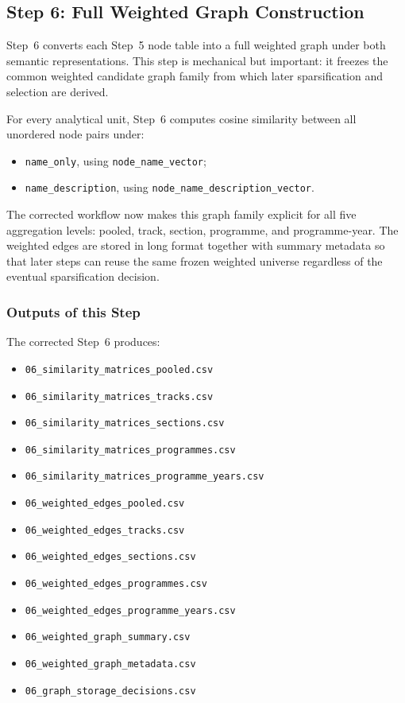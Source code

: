 \subsection{Step 6: Full Weighted Graph Construction}
\label{sec:step6_weighted_graphs}

Step~6 converts each Step~5 node table into a full weighted graph under both semantic representations. This step is mechanical but important: it freezes the common weighted candidate graph family from which later sparsification and selection are derived.

For every analytical unit, Step~6 computes cosine similarity between all unordered node pairs under:
\begin{itemize}
    \item \texttt{name\_only}, using \texttt{node\_name\_vector};
    \item \texttt{name\_description}, using \texttt{node\_name\_description\_vector}.
\end{itemize}

The corrected workflow now makes this graph family explicit for all five aggregation levels: pooled, track, section, programme, and programme-year. The weighted edges are stored in long format together with summary metadata so that later steps can reuse the same frozen weighted universe regardless of the eventual sparsification decision.

\subsubsection{Outputs of this Step}
\label{sec:step6_outputs}

The corrected Step~6 produces:
\begin{itemize}
    \item \texttt{06\_similarity\_matrices\_pooled.csv}
    \item \texttt{06\_similarity\_matrices\_tracks.csv}
    \item \texttt{06\_similarity\_matrices\_sections.csv}
    \item \texttt{06\_similarity\_matrices\_programmes.csv}
    \item \texttt{06\_similarity\_matrices\_programme\_years.csv}
    \item \texttt{06\_weighted\_edges\_pooled.csv}
    \item \texttt{06\_weighted\_edges\_tracks.csv}
    \item \texttt{06\_weighted\_edges\_sections.csv}
    \item \texttt{06\_weighted\_edges\_programmes.csv}
    \item \texttt{06\_weighted\_edges\_programme\_years.csv}
    \item \texttt{06\_weighted\_graph\_summary.csv}
    \item \texttt{06\_weighted\_graph\_metadata.csv}
    \item \texttt{06\_graph\_storage\_decisions.csv}
\end{itemize}

